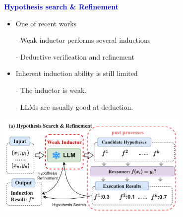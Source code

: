 \documentclass[professionalfont]{beamer}
\begin{document}
\begin{frame}
\begin{center}
    { \textbf{\textcolor{blue}{ {\fontsize{12}{14}\selectfont Hypothesis search \& Refinement} }} }
\end{center}

{\fontsize{10}{14}\selectfont 
\begin{itemize}
    \item One of recent works
    
    - Weak inductor performs several inductions
    
    - Deductive verification and refinement
\end{itemize}

\begin{itemize}
    \item Inherent induction ability is still limited
    
    - The inductor is weak.
    
    - LLMs are usually good at deduction.
\end{itemize}
}

\begin{center}
    \includegraphics[width=0.7\textwidth]{figure2-1.png}
\end{center}

\end{frame}
\end{document}
